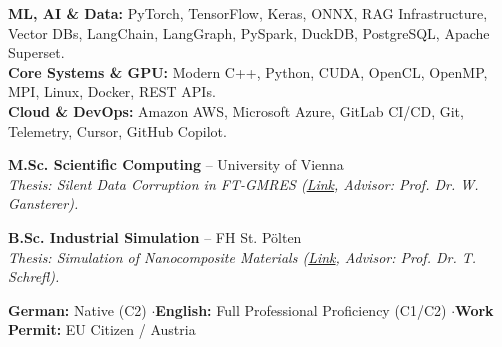 \documentclass[10pt,a4paper]{article}
\begin{document}

\textbf{ML, AI \& Data:} PyTorch, TensorFlow, Keras, ONNX, RAG Infrastructure, Vector DBs, LangChain, LangGraph, PySpark, DuckDB, PostgreSQL, Apache Superset.\\[0.05em]
\textbf{Core Systems \& GPU:} Modern C++, Python, CUDA, OpenCL, OpenMP, MPI, Linux, Docker, REST APIs.\\[0.05em]
\textbf{Cloud \& DevOps:} Amazon AWS, Microsoft Azure, GitLab CI/CD, Git, Telemetry, Cursor, GitHub Copilot.


\textbf{M.Sc. Scientific Computing} -- University of Vienna \\
\textit{Thesis: Silent Data Corruption in FT-GMRES (\href{https://utheses.univie.ac.at/detail/40917/}{Link}, Advisor: Prof. Dr. W. Gansterer).}

\vspace{0.1cm}
\textbf{B.Sc. Industrial Simulation} -- FH St. Pölten \\
\textit{Thesis: Simulation of Nanocomposite Materials (\href{\meinGithub/thesis/blob/master/Bakkarbeit_final.pdf}{Link}, Advisor: Prof. Dr. T. Schrefl).}

\engineeringApproach


\textbf{German:} Native (C2) \quad$\cdot$\quad \textbf{English:} Full Professional Proficiency (C1/C2) \quad$\cdot$\quad \textbf{Work Permit:} EU Citizen / Austria
\end{document}
